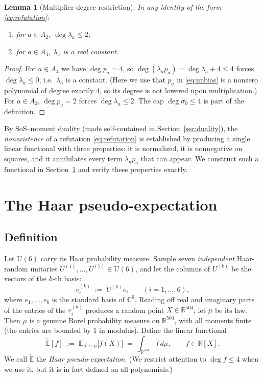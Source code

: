 \documentclass{amsart}
\newtheorem{lemma}{Lemma}
\theoremstyle{definition}
\begin{document}
\begin{lemma}[Multiplier degree restriction]\label{lem:multdeg}
In any identity of the form \eqref{eq:refutation}:
\begin{enumerate}
\item for $a\in A_2$, $\deg\lambda_a\le 2$;
\item for $a\in A_4$, $\lambda_a$ is a real constant.
\end{enumerate}
\end{lemma}

\begin{proof}
For $a\in A_4$ we have $\deg p_a=4$, so $\deg(\lambda_a p_a)=\deg\lambda_a+4\le 4$ forces
$\deg\lambda_a\le 0$, i.e.\ $\lambda_a$ is a constant. (Here we use that $p_a$ in
\eqref{eq:unbias} is a nonzero polynomial of degree exactly $4$, so its degree is not lowered
upon multiplication.) For $a\in A_2$, $\deg p_a=2$ forces $\deg\lambda_a\le2$. The cap
$\deg\sigma_0\le 4$ is part of the definition. \qedhere
\end{proof}

By SoS--moment duality (made self-contained in Section~\ref{sec:duality}), the
\emph{nonexistence} of a refutation \eqref{eq:refutation} is established by producing a single
linear functional with three properties: it is normalized, it is nonnegative on squares, and it
annihilates every term $\lambda_a p_a$ that can appear. We construct such a functional in
Section~\ref{sec:pe} and verify these properties exactly.

\section{The Haar pseudo-expectation}\label{sec:pe}

\subsection{Definition}
Let $\mathrm{U}(6)$ carry its Haar probability measure. Sample seven \emph{independent}
Haar-random unitaries $U^{(1)},\dots,U^{(7)}\in\mathrm{U}(6)$, and let the columns of $U^{(k)}$
be the vectors of the $k$-th basis:
\begin{equation}\label{eq:sampling}
v^{(k)}_i \;:=\; U^{(k)} e_i\qquad(i=1,\dots,6),
\end{equation}
where $e_1,\dots,e_6$ is the standard basis of $\mathbb{C}^6$. Reading off real and imaginary
parts of the entries of the $v^{(k)}_i$ produces a random point $X\in\mathbb{R}^{504}$; let
$\mu$ be its law. Then $\mu$ is a genuine Borel probability measure on $\mathbb{R}^{504}$, with
all moments finite (the entries are bounded by $1$ in modulus). Define the linear functional
\begin{equation}\label{eq:Edef}
\widetilde{\mathbb{E}}[f]\;:=\;\mathbb{E}_{X\sim\mu}\bigl[f(X)\bigr]\;=\;\int_{\mathbb{R}^{504}} f\,d\mu ,
\qquad f\in\mathbb{R}[X].
\end{equation}
We call $\widetilde{\mathbb{E}}$ the \emph{Haar pseudo-expectation}. (We restrict attention to
$\deg f\le 4$ when we use it, but it is in fact defined on all polynomials.)
\end{document}
